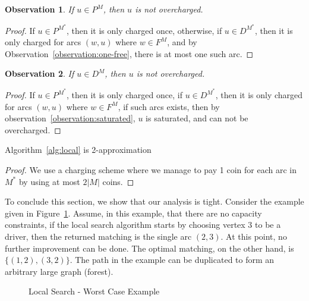 \documentclass[]{llncs}
\newtheorem{observation}{Observation}
\begin{document}
\begin{observation}
\label{observation:p-not-charged}
If $u \in P^M$, then $u$ is not overcharged.
\end{observation}

\begin{proof}
If $u \in P^{M^*}$, then it is only charged once, otherwise, 
if $u \in D^{M^*}$, then it is only charged for arcs $(w, u)$ where $w \in F^M$,
and by Observation~\ref{observation:one-free}, there is at most one such arc. 
\end{proof}

\begin{observation}
\label{observation:d-not-charged}
If $u \in D^M$, then $u$ is not overcharged.
\end{observation}

\begin{proof}
If $u \in P^{M^*}$, then it is only charged once, 
if $u \in D^{M^*}$, then it is only charged for arcs $(w, u)$ where $w \in F^M$,
if such arcs exists, then by observation~\ref{observation:saturated}, $u$ is saturated, 
and can not be overcharged.
\end{proof}

\begin{theorem}
Algorithm~\ref{alg:local} is 2-approximation
\end{theorem}

\begin{proof}
We use a charging scheme where we manage to pay 1 coin for each arc in $M^*$
by using at most $2|M|$ coins.
\end{proof}


To conclude this section, we show that our analysis is tight.
Consider the example given in Figure~\ref{fig:localtight}.
Assume, in this example, that there are no capacity constraints,
if the local search algorithm starts by choosing vertex $3$ to be a driver, 
then the returned matching is the single arc $(2,3)$.
At this point, no further improvement can be done.
The optimal matching, on the other hand, is $\{(1, 2), (3, 2)\}$. 
The path in the example can be duplicated to form an arbitrary large graph (forest).

\begin{figure} 
\centering
{}
\caption{
\label{fig:localtight}
Local Search - Worst Case Example
}
\end{figure}
\end{document}
